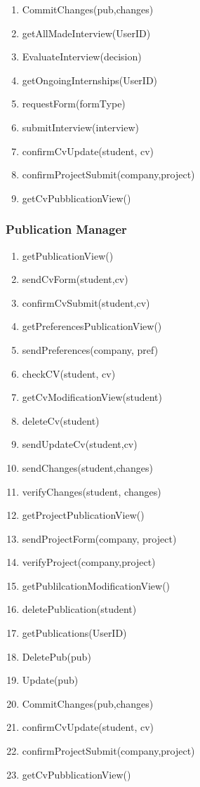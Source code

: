\documentclass{article}
\begin{document}
\begin{enumerate}
    \item CommitChanges(pub,changes)
    \item getAllMadeInterview(UserID)
    \item EvaluateInterview(decision)
    \item getOngoingInternships(UserID)
    \item requestForm(formType)
    \item submitInterview(interview)
    \item confirmCvUpdate(student, cv)
    \item confirmProjectSubmit(company,project)
    \item getCvPubblicationView()
\end{enumerate}

\subsubsection{Publication Manager}
\begin{enumerate}
    \item getPublicationView()
    \item sendCvForm(student,cv)
    \item confirmCvSubmit(student,cv)
    \item getPreferencesPublicationView()
    \item sendPreferences(company, pref)
    \item checkCV(student, cv) 
    \item getCvModificationView(student)
    \item deleteCv(student)
    \item sendUpdateCv(student,cv)
    \item sendChanges(student,changes)
    \item verifyChanges(student, changes)
    \item getProjectPublicationView()
    \item sendProjectForm(company, project)
    \item verifyProject(company,project)
    \item getPublilcationModificationView()
    \item deletePublication(student)
    \item getPublications(UserID)
    \item DeletePub(pub)
    \item Update(pub)
    \item CommitChanges(pub,changes)
    \item confirmCvUpdate(student, cv)
    \item confirmProjectSubmit(company,project)
    \item getCvPubblicationView()
\end{enumerate}
\end{document}
